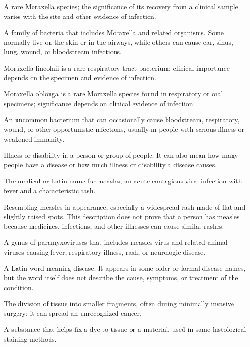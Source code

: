  A rare Moraxella species; the significance of its recovery from a clinical sample varies with the site and other evidence of infection.

 A family of bacteria that includes Moraxella and related organisms. Some normally live on the skin or in the airways, while others can cause ear, sinus, lung, wound, or bloodstream infections.

 Moraxella lincolnii is a rare respiratory-tract bacterium; clinical importance depends on the specimen and evidence of infection.

 Moraxella oblonga is a rare Moraxella species found in respiratory or oral specimens; significance depends on clinical evidence of infection.

 An uncommon bacterium that can occasionally cause bloodstream, respiratory, wound, or other opportunistic infections, usually in people with serious illness or weakened immunity.

 Illness or disability in a person or group of people. It can also
mean how many people have a disease or how much illness or disability a disease causes.

 The medical or Latin name for measles, an acute contagious viral infection with fever and a characteristic rash.

 Resembling measles in appearance, especially a widespread rash made of flat and slightly raised spots. This description does not prove that a person has measles because medicines, infections, and other illnesses can cause similar rashes.

 A genus of paramyxoviruses that includes measles virus and related animal viruses causing fever, respiratory illness, rash, or neurologic disease.

 A Latin word meaning disease. It appears in some older or formal disease names, but the word itself does not describe the cause, symptoms, or treatment of the condition.

 The division of tissue into smaller fragments, often during minimally invasive surgery; it can spread an unrecognized cancer.

 A substance that helps fix a dye to tissue or a material, used in some histological staining methods.


